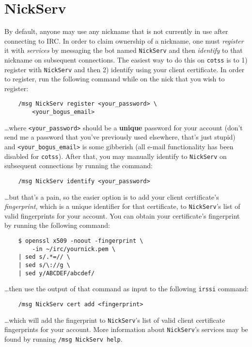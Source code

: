 \documentclass{article}
\begin{document}
{\section{NickServ}
By default, anyone may use any nickname that is not currently in use after connecting to IRC.  In order to claim ownership of a nickname, one must \textit{register} it with \textit{services} by messaging the bot named \texttt{NickServ} and then \textit{identify} to that nickname on subsequent connections.  The easiest way to do this on \texttt{cotss} is to 1) register with \texttt{NickServ} and then 2) identify using your client certificate.  In order to register, run the following command while on the nick that you wish to register:
\begin{lstlisting}
    /msg NickServ register <your_password> \
        <your_bogus_email>
\end{lstlisting}
\ldots where \texttt{<your\_password>} should be a \textbf{unique} password for your account (don't send me a password that you've previously used elsewhere, that's just stupid) and \texttt{<your\_bogus\_email>} is some gibberish (all e-mail functionality has been disabled for \texttt{cotss}).  After that, you may manually identify to \texttt{NickServ} on subsequent connections by running the command:
\begin{lstlisting}
    /msg NickServ identify <your_password>
\end{lstlisting}
\ldots but that's a pain, so the easier option is to add your client certificate's \textit{fingerprint}, which is a unique identifier for that certificate, to \texttt{NickServ}'s list of valid fingerprints for your account.  You can obtain your certificate's fingerprint by running the following command:
\begin{lstlisting}
    $ openssl x509 -noout -fingerprint \
        -in ~/irc/yournick.pem \
	| sed s/.*=// \
	| sed s/\://g \
	| sed y/ABCDEF/abcdef/
\end{lstlisting}
\ldots then use the output of that command as input to the following \texttt{irssi} command:
\begin{lstlisting}
    /msg NickServ cert add <fingerprint>
\end{lstlisting}
\ldots which will add the fingerprint to \texttt{NickServ}'s list of valid client certificate fingerprints for your account.  More information about \texttt{NickServ}'s services may be found by running \texttt{/msg NickServ help}.

}
\end{document}
